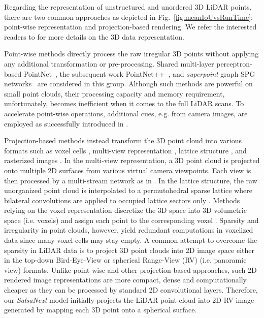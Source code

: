 \documentclass[letterpaper, 10 pt, conference]{ieeeconf}
\makeatletter
\newcommand{\snx}[1]{\textit{SalsaNext }{#1}}
\def\eg{e.g.\@\xspace}
\def\ie{i.e.\@\xspace}
\makeatother
\begin{document}
Regarding the representation of   unstructured and  unordered 3D LiDAR points,  there are two common approaches as depicted in Fig.~\ref{fig:meanIoUvsRunTime}: point-wise representation   and  projection-based rendering. We refer the interested readers to \cite{survey3DPC2019} for more details on the 3D data representation.

Point-wise methods  \cite{pointnet,pointnetpp} directly process the raw irregular 3D points without applying any additional transformation or pre-processing.
Shared  multi-layer perceptron-based PointNet~\cite{pointnet}, the subsequent work PointNet++~\cite{pointnetpp}, and \textit{superpoint} graph SPG networks~\cite{SPGraph} are considered in this group. 
Although such methods are powerful on small point clouds, their processing capacity and memory requirement, unfortunately, becomes inefficient when it comes to     the full  LiDAR scans. 
To accelerate point-wise operations, additional cues, \eg from camera images, are employed as successfully introduced in \cite{Frustum2017}.

Projection-based methods instead transform the 3D point cloud into various formats such as  voxel cells \cite{Zhang2018,VoxelNet18,SEGCloud2017}, multi-view representation \cite{Felix17}, lattice structure \cite{SPLATNet,LatticeNet},  and rasterized images \cite{salsanet2020,SqueezesegV01,SqueezesegV02,SqueezesegV03}. 
In the multi-view representation, a 3D point cloud is projected onto multiple 2D surfaces from various virtual camera viewpoints. Each view is then processed by a multi-stream network as in \cite{Felix17}. 
In the lattice structure, the raw unorganized point cloud is interpolated to a permutohedral sparse
lattice where bilateral convolutions are applied to occupied lattice sectors only \cite{SPLATNet}. 
Methods relying on the voxel representation  discretize the 3D space into 3D volumetric space (\ie voxels) and assign each point to the corresponding voxel \cite{Zhang2018,VoxelNet18,SEGCloud2017}. Sparsity and irregularity in point clouds, however,  yield redundant computations in voxelized data since many voxel cells may stay empty. 
A common attempt to overcome the sparsity in LiDAR data is to project 3D point clouds into 2D image space either in the top-down Bird-Eye-View  \cite{salsanet2020,rt3d2018,ComplexYolo} or spherical Range-View (RV) (\ie panoramic view) 
 \cite{rangenetpp,SqueezesegV01,SqueezesegV02,SqueezesegV03,3Dmininet,PointSeg18} formats.
Unlike point-wise and other projection-based approaches, such 2D rendered image representations are more compact, dense and computationally cheaper as they can be processed by standard 2D convolutional layers. Therefore, our \snx model initially projects the LiDAR point cloud into 2D RV image   generated by mapping each 3D point onto a spherical surface.	
\end{document}
